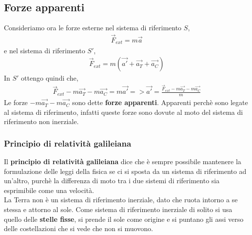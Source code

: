     \subsection{Forze apparenti}
        Consideriamo ora le forze esterne nel sistema di riferimento $S$,
        \begin{align*}
            \vec{F}_{ext}=m\vec{a}
        \end{align*}
        e nel sistema di riferimento $S'$,
        \begin{align*}
            \vec{F}_{ext}=m(\vec{a'}+\vec{a_T}+\vec{a_C})
        \end{align*}
        In $S'$ ottengo quindi che,
        \begin{align*}
            \vec{F}_{ext}-m\vec{a_T}-m\vec{a_C}=m\vec{a'} => \vec{a'} = \frac{\vec{F}_{ext}-m\vec{a_T}-m\vec{a_C}}{m}
        \end{align*}
        Le forze $-m\vec{a_T}-m\vec{a_C}$ sono dette \textbf{forze apparenti}. Apparenti perchè sono legate al sistema di riferimento, infatti queste forze sono dovute al moto del sistema di riferimento non inerziale.

        \subsubsection{Principio di relatività galileiana}
            Il \textbf{principio di relatività galileiana} dice che è sempre possibile mantenere la formulazione delle leggi della fisica se ci si sposta da un sistema di riferimento ad un'altro, purchè la differenza di moto tra i due sistemi di riferimento sia esprimibile come una velocità.\\
            La Terra non è un sistema di riferimento inerziale, dato che ruota intorno a se stessa e attorno al sole. Come sistema di riferimento inerziale di solito si usa quello delle \textbf{stelle fisse}, si prende il sole come origine e si puntano gli assi verso delle costellazioni che si vede che non si muovono.


